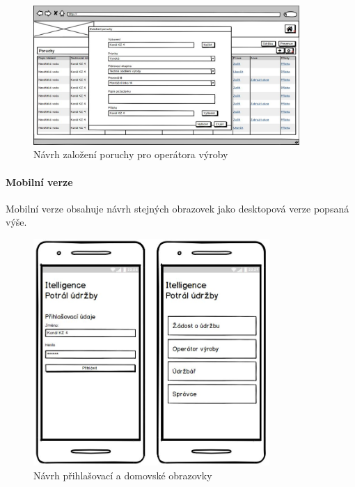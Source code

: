 \documentclass[thesis=M,czech]{FITthesis}[2012/06/26]
\begin{document}
\begin{figure}[H]
	\centering
	\includegraphics[width=0.9\textwidth]{images/bal_poruchy_seznam_zalozeni_poruchy}
	\caption{Návrh založení poruchy pro operátora výroby}
	\label{img:bal_poruchy_seznam_zalozeni_poruchy_desktop}
\end{figure}

\paragraph{Mobilní verze}
Mobilní verze obsahuje návrh stejných obrazovek jako desktopová verze popsaná výše. 

\begin{figure}[H]
	\centering
	\includegraphics[width=0.8\textwidth]{images/bal_login_hompage_mob}
	\caption{Návrh přihlašovací a domovské obrazovky}
	\label{img:bal_login_hompage_mob}
\end{figure}
\end{document}
